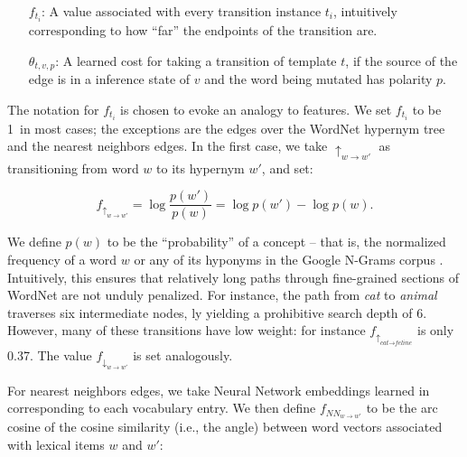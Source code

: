\vspace{-0.25em}
\begin{itemize}
  \setlength{\itemsep}{-0.25em}
  \indentitem\item[$f_{t_i}$:]
    A value associated with every transition instance $t_i$, intuitively
      corresponding to how ``far'' the endpoints of the transition are.
  \indentitem\item[$\theta_{t,v,p}$:]
    A learned cost for taking a transition of template $t$, if the source
    of the edge is in a inference state of $v$ and the word being mutated
    has polarity $p$.
\end{itemize}
\vspace{-0.25em}

The notation for $f_{t_i}$ is chosen to evoke an analogy to features.
We set $f_{t_i}$ to be 1\ in most cases;
  the exceptions are the edges over the WordNet hypernym tree
  and the nearest neighbors edges.
In the first case, we take $\uparrow_{w \rightarrow w'}$ as transitioning
  from word $w$ to its hypernym $w'$, and set:

\vspace{-0.5em}
\begin{equation*}
  f_{\uparrow_{w \rightarrow w'}}   = \log \frac{p(w')}{p(w)} = \log p(w') - \log p(w).
\end{equation*}
\vspace{-0.5em}

We define $p(w)$ to be the ``probability'' of a concept --
  that is, the normalized frequency
  of a word $w$ or any of its hyponyms in the Google N-Grams corpus
  \cite{key:2006brants-ngrams}.
Intuitively, this ensures that relatively long paths through fine-grained
  sections of WordNet are not unduly penalized.
For instance, the path from \textit{cat} to \textit{animal} traverses
  six intermediate nodes, \naive ly yielding a prohibitive
  search depth of 6.
However, many of these transitions have low weight:
  for instance
  $f_{\uparrow_{\textit{cat} \rightarrow \textit{feline}}}$ is only
  \num{0.37}.
The value $f_{\downarrow_{w \rightarrow w'}}$ is set analogously.

For nearest neighbors edges, we take Neural Network embeddings learned
  in  corresponding to each vocabulary entry.
We then define $f_{NN_{w \rightarrow w'}}$
  to be the arc cosine of the cosine similarity (i.e., the angle)
  between word vectors associated with lexical items $w$ and $w'$:

